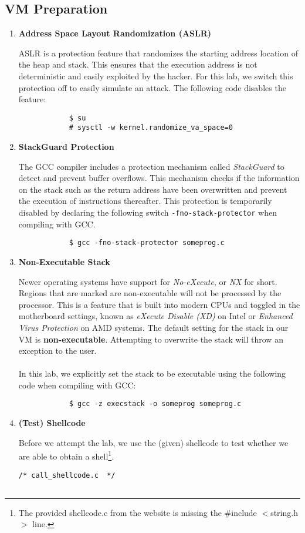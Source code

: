\documentclass[a4paper,12pt]{article}
\begin{document}
	\subsection{VM Preparation}
	\vspace{1em}
	\begin{enumerate}
		\item \textbf{Address Space Layout Randomization (ASLR)} \begin{par}ASLR is a protection feature that randomizes the starting address location of the heap and stack. This ensures that the execution address is not deterministic and easily exploited by the hacker. For this lab, we switch this protection off to easily simulate an attack. The following code disables the feature:
			\begin{verbatim}
			$ su
			# sysctl -w kernel.randomize_va_space=0
			\end{verbatim}
		\end{par}
		\item \textbf{StackGuard Protection}\begin{par}The GCC compiler includes a protection mechanism called \textit{StackGuard} to detect and prevent buffer overflows. This mechanism checks if the information on the stack such as the return address have been overwritten and prevent the execution of instructions thereafter. This protection is temporarily disabled by declaring the following switch \texttt{-fno-stack-protector} when compiling with GCC.\begin{verbatim}
			$ gcc -fno-stack-protector someprog.c\end{verbatim}
		\end{par}
		\item \textbf{Non-Executable Stack}\begin{par}Newer operating systems have support for \textit{No-eXecute}, or \textit{NX} for short. Regions that are marked are non-executable will not be processed by the processor. This is a feature that is built into modern CPUs and toggled in the motherboard settings, known as \textit{eXecute Disable (XD)} on Intel or \textit{Enhanced Virus Protection} on AMD systems. The default setting for the stack in our VM is  \textbf{non-executable}. Attempting to overwrite the stack will throw an exception to the user. \\\\In this lab, we explicitly set the stack to be executable using the following code when compiling with GCC:
			\begin{verbatim}
			$ gcc -z execstack -o someprog someprog.c
			\end{verbatim}
		\end{par}
		\newpage
		\item \textbf{(Test) Shellcode} \begin{par}
			Before we attempt the lab, we use the (given) shellcode to test whether we are able to obtain a shell\footnote{The provided shellcode.c from the website is missing the
				\#include $<$string.h$>$ line.}.\end{par}
		\begin{verbatim}
/* call_shellcode.c  */
		

\end{verbatim}
\end{enumerate}
\end{document}
